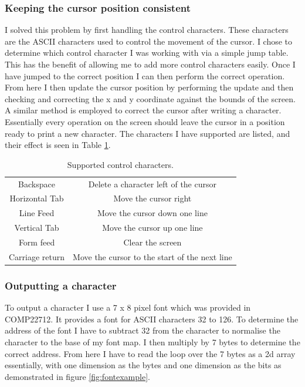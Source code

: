 \subsubsection{Keeping the cursor position consistent}
I solved this problem by first handling the control characters. These characters are the ASCII characters used to control the movement of the cursor. I chose to determine which control character I was working with via a simple jump table. This has the benefit of allowing me to add more control characters easily. Once I have jumped to the correct position I can then perform the correct operation. From here I then update the cursor position by performing the update and then checking and correcting the x and y coordinate against the bounds of the screen. A similar method is employed to correct the cursor after writing a character. Essentially every operation on the screen should leave the cursor in a position ready to print a new character. The characters I have supported are listed, and their effect is seen in Table \ref{controlcharacters}.
\begin{table}[H]
	\centering
	\caption{Supported control characters.\label{controlcharacters}}
	\begin{tabular}{|c|c|}
		\hline
		Backspace & Delete a character left of the cursor \\
		Horizontal Tab & Move the cursor right \\
		Line Feed & Move the cursor down one line \\
		Vertical Tab & Move the cursor up one line \\
		Form feed & Clear the screen \\
		Carriage return & Move the cursor to the start of the next line \\
		\hline
	\end{tabular}
\end{table}
\subsubsection{Outputting a character}
To output a character I use a 7 x 8 pixel font which was provided in COMP22712. It provides a font for ASCII characters 32 to 126. To determine the address of the font I have to subtract 32 from the character to normalise the character to the base of my font map. I then multiply by 7 bytes to determine the correct address. From here I have to read the loop over the 7 bytes as a 2d array essentially, with one dimension as the bytes and one dimension as the bits as demonstrated in figure \ref{fig:fontexample}.


